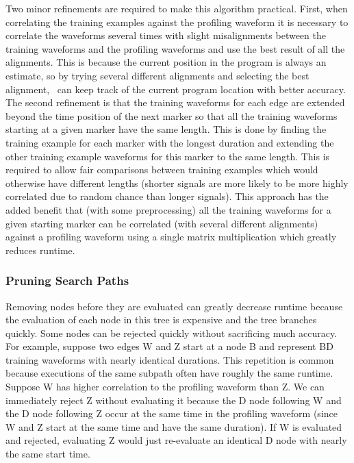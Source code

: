 Two minor refinements are required to make this algorithm practical. First, when correlating the training examples against the profiling waveform it is necessary to correlate the waveforms several times with slight misalignments between the training waveforms and the profiling waveforms and use the best result of all the alignments. This is because the current position in the program is always an estimate, so by trying several different alignments and selecting the best alignment, \zop\ can keep track of the current program location with better accuracy. The second refinement is that the training waveforms for each edge are extended beyond the time position of the next marker so that all the training waveforms starting at a given marker have the same length. This is done by finding the training example for each marker with the longest duration and extending the other training example waveforms for this marker to the same length. This is required to allow fair comparisons between training examples which would otherwise have different lengths (shorter signals are more likely to be more highly correlated due to random chance than longer signals). This approach has the added benefit that (with some preprocessing) all the training waveforms for a given starting marker can be correlated (with several different alignments) against a profiling waveform using a single matrix multiplication which greatly reduces runtime.

\subsubsection{Pruning Search Paths}
Removing nodes before they are evaluated can greatly decrease runtime because the evaluation of each node in this tree is expensive and the tree branches quickly. Some nodes can be rejected quickly without sacrificing much accuracy. For example, suppose two edges W and Z start at a node B and represent BD training waveforms with nearly identical durations. This repetition is common because executions of the same subpath often have roughly the same runtime. Suppose W has higher correlation to the profiling waveform than Z. We can immediately reject Z without evaluating it because the D node following W and the D node following Z occur at the same time in the profiling waveform (since W and Z start at the same time and have the same duration). If W is evaluated and rejected, evaluating Z would just re-evaluate an identical D node with nearly the same start time.

